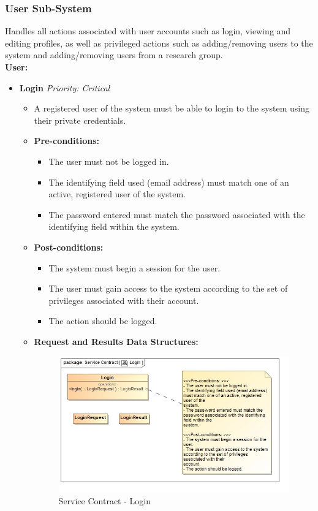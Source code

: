 \documentclass{article}
\begin{document}
			\subsubsection{User Sub-System}\label{subsubsec:user}
				Handles all actions associated with user accounts such as login, viewing and editing profiles, as well as privileged actions such as adding/removing users to the system and adding/removing users from a research group.\\
				[3mm]
				\textbf{User:}
				\begin{itemize}
					\item \textbf{Login} \hfill \textit{Priority: Critical}
					\begin{itemize}
						\item A registered user of the system must be able to login to the system using their private credentials.
						\item \textbf{Pre-conditions:}
						\begin{itemize}
							\item The user must not be logged in.
							\item The identifying field used (email address) must match one of an active, registered user of the system.
							\item The password entered must match the password associated with the identifying field within the system.
						\end{itemize}
						\item \textbf{Post-conditions:}
						\begin{itemize}
							\item The system must begin a session for the user.
							\item The user must gain access to the system according to the set of privileges associated with their account.		
							\item The action should be logged.
						\end{itemize}
						\item \textbf{Request and Results Data Structures:}
						\begin{figure}[H]
							\includegraphics[width=\linewidth]{../Diagrams/ServiceContracts/Login.jpg}
							\caption{Service Contract - Login}
						\end{figure}
					\end{itemize}
					

\end{itemize}
\end{document}
